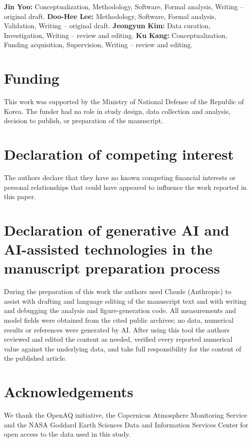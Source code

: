 \documentclass[review,times,authoryear]{elsarticle}
\begin{document}
\textbf{Jin Yoo:} Conceptualization, Methodology, Software, Formal analysis,
Writing -- original draft. \textbf{Doo-Hee Lee:} Methodology, Software, Formal analysis,
Validation, Writing -- original draft. \textbf{Jeongyun Kim:} Data curation,
Investigation, Writing -- review and editing. \textbf{Ku Kang:} Conceptualization,
Funding acquisition, Supervision, Writing -- review and editing.

\section*{Funding}

This work was supported by the Ministry of National Defense of the Republic of Korea.
The funder had no role in study design, data collection and analysis, decision to
publish, or preparation of the manuscript.

\section*{Declaration of competing interest}

The authors declare that they have no known competing financial interests or personal
relationships that could have appeared to influence the work reported in this paper.

\section*{Declaration of generative AI and AI-assisted technologies in the manuscript preparation process}

During the preparation of this work the authors used Claude (Anthropic) to
assist with drafting and language editing of the manuscript text and with writing and
debugging the analysis and figure-generation code. All measurements and model fields were
obtained from the cited public archives; no data, numerical results or references were
generated by AI. After using this tool the authors reviewed and edited the content as
needed, verified every reported numerical value against the underlying data, and take
full responsibility for the content of the published article.

\section*{Acknowledgements}

We thank the OpenAQ initiative, the Copernicus Atmosphere Monitoring Service and the
NASA Goddard Earth Sciences Data and Information Services Center for open access to the
data used in this study.



\end{document}
